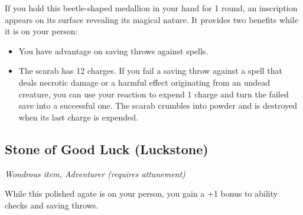 If you hold this beetle-shaped medallion in your hand for 1 round, an inscription appears on its surface revealing its magical nature. It provides two benefits while it is on your person:
\begin{itemize}
\item You have advantage on saving throws against spells.
\item The scarab has 12 charges. If you fail a saving throw against a spell that deals necrotic damage or a harmful effect originating from an undead creature, you can use your reaction to expend 1 charge and turn the failed save into a successful one. The scarab crumbles into powder and is destroyed when its last charge is expended.
\end{itemize}

\subsection{Stone of Good Luck (Luckstone)}
\textit{Wondrous item, Adventurer (requires attunement)} 

While this polished agate is on your person, you gain a +1 bonus to ability checks and saving throws.